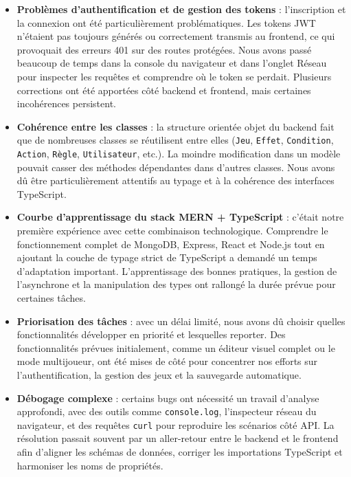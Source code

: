 \documentclass[12pt]{article}        %
\begin{document}
\begin{itemize}
  \item \textbf{Problèmes d’authentification et de gestion des tokens} : l’inscription et la connexion ont été particulièrement problématiques. Les tokens JWT n’étaient pas toujours générés ou correctement transmis au frontend, ce qui provoquait des erreurs 401 sur des routes protégées. Nous avons passé beaucoup de temps dans la console du navigateur et dans l’onglet Réseau pour inspecter les requêtes et comprendre où le token se perdait. Plusieurs corrections ont été apportées côté backend et frontend, mais certaines incohérences persistent.
  
  \item \textbf{Cohérence entre les classes} : la structure orientée objet du backend fait que de nombreuses classes se réutilisent entre elles (\texttt{Jeu}, \texttt{Effet}, \texttt{Condition}, \texttt{Action}, \texttt{Règle}, \texttt{Utilisateur}, etc.). La moindre modification dans un modèle pouvait casser des méthodes dépendantes dans d’autres classes. Nous avons dû être particulièrement attentifs au typage et à la cohérence des interfaces TypeScript.
  
  \item \textbf{Courbe d’apprentissage du stack MERN + TypeScript} : c’était notre première expérience avec cette combinaison technologique. Comprendre le fonctionnement complet de MongoDB, Express, React et Node.js tout en ajoutant la couche de typage strict de TypeScript a demandé un temps d’adaptation important. L’apprentissage des bonnes pratiques, la gestion de l’asynchrone et la manipulation des types ont rallongé la durée prévue pour certaines tâches.

  \item \textbf{Priorisation des tâches} : avec un délai limité, nous avons dû choisir quelles fonctionnalités développer en priorité et lesquelles reporter. Des fonctionnalités prévues initialement, comme un éditeur visuel complet ou le mode multijoueur, ont été mises de côté pour concentrer nos efforts sur l’authentification, la gestion des jeux et la sauvegarde automatique.
  
  \item \textbf{Débogage complexe} : certains bugs ont nécessité un travail d’analyse approfondi, avec des outils comme \texttt{console.log}, l’inspecteur réseau du navigateur, et des requêtes \texttt{curl} pour reproduire les scénarios côté API. La résolution passait souvent par un aller-retour entre le backend et le frontend afin d’aligner les schémas de données, corriger les importations TypeScript et harmoniser les noms de propriétés.
  

\end{itemize}
\end{document}
